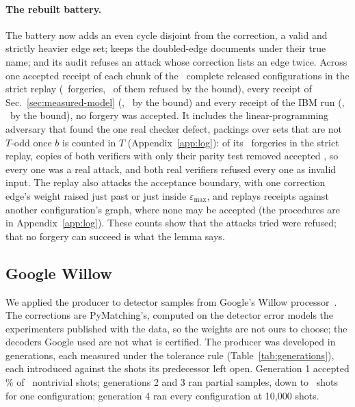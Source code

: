 \documentclass[aps,pra,twocolumn,superscriptaddress,nofootinbib,longbibliography,floatfix]{revtex4-2}
\newcommand{\eps}{\varepsilon}
\newcommand{\T}{T}
\begin{document}
\paragraph*{The rebuilt battery.} The battery now adds an even cycle disjoint from the correction, a valid and strictly heavier edge set; keeps the doubled-edge documents under their true name; and its audit refuses an attack whose correction lists an edge twice. Across one accepted receipt of each chunk of the \ReplayArchivesComplete\ complete released configurations in the strict replay (\ReplayForgeries\ forgeries, \ReplayForgeriesBound\ of them refused by the bound), every receipt of Sec.~\ref{sec:measured-model} (\CertMeasForgeries, \CertMeasBoundForgeries\ by the bound) and every receipt of the IBM run (\IbmEpsForgeries, \IbmEpsForgeriesBound\ by the bound), no forgery was accepted. It includes the linear-programming adversary that found the one real checker defect, packings over sets that are not $\T$-odd once $b$ is counted in $\T$ (Appendix~\ref{app:log}): of its \ReplayParity\ forgeries in the strict replay, copies of both verifiers with only their parity test removed accepted \ReplayParityFool, so every one was a real attack, and both real verifiers refused every one as invalid input. The replay also attacks the acceptance boundary, with one correction edge's weight raised just past or just inside $\eps_{\max}$, and replays receipts against another configuration's graph, where none may be accepted (the procedures are in Appendix~\ref{app:log}). These counts show that the attacks tried were refused; that no forgery can succeed is what the lemma says.

\subsection{Google Willow}

We applied the producer to detector samples from Google's Willow processor~\cite{google2025below,google2024data}. The corrections are PyMatching's, computed on the detector error models the experimenters published with the data, so the weights are not ours to choose; the decoders Google used are not what is certified. The producer was developed in generations, each measured under the tolerance rule (Table~\ref{tab:generations}), each introduced against the shots its predecessor left open. Generation 1 accepted \HwGenOnePct\% of \HwGenOneNontrivial\ nontrivial shots; generations 2 and 3 ran partial samples, down to \HwGenTwoMinConfig\ shots for one configuration; generation 4 ran every configuration at 10{,}000 shots.
\end{document}
